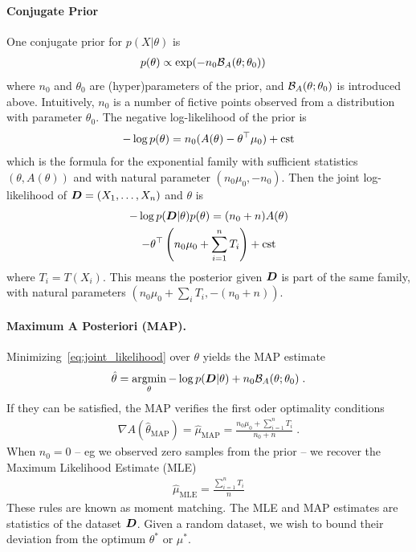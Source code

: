 \documentclass[twoside]{article}
\newcommand{\logpart}{A}
\newcommand{\bregman}{\cB_\logpart}
\newcommand{\natp}{\theta}
\newcommand{\meanp}{\mu}
\begin{document}
\paragraph{Conjugate Prior}
One conjugate prior \citep{agarwal2010geometric} for $p(X|\natp)$ is
\begin{align}
    p(\natp) &\propto \exp( - n_0 \bregman(\natp ; \natp_0) )
\end{align}
where $n_0$ and $\natp_0$ are (hyper)parameters of the prior, and $\bregman(\natp ; \natp_0)$ is introduced above.
Intuitively, $n_0$ is a number of fictive points observed from a distribution with parameter $\natp_0$.
The negative log-likelihood of the prior is
\begin{align*}
    -\log p(\natp) = n_0 (\logpart(\natp)  - \natp^\top \meanp_0 ) + \cst
\end{align*}
which is the formula for the exponential family with sufficient statistics $(\natp ,\logpart(\natp))$ and with natural parameter $(n_0 \mu_0, -n_0)$.
Then the joint log-likelihood of ${\bm{D}} =(X_1,\dots,X_n)$ and $\natp$ is
\begin{multline}
    -\log p(\mD|\natp)p(\natp) 
    = (n_0+n) \logpart (\natp) \\
    - \theta^\top \left(n_0 \meanp_0 + \sum_{i=1}^n T_i \right) + \cst
    \label{eq:joint_likelihood}
\end{multline}
where $T_i=T(X_i)$.
This means the posterior given ${\bm{D}}$ is part of the same family, with natural parameters $(n_0 \mu_0 + \sum_i T_i , -(n_0 + n))$.

\paragraph{Maximum A Posteriori (MAP).}
Minimizing~\eqref{eq:joint_likelihood} over $\natp$ yields the MAP estimate
\begin{align}
    \hat \natp = \argmin_\natp -\log p(\mD|\natp) + n_0 \bregman(\natp ; \natp_0) \; .
\end{align}
If they can be satisfied, the MAP verifies the first oder optimality conditions
\begin{align}
    \nabla \logpart(\hat \natp_\text{MAP}) = \hat \meanp_\text{MAP}
    = \frac{n_0 \meanp_0 + \sum_{i=1}^n T_i}{n_0+n} \; .
\end{align}
When $n_0=0$ -- eg we observed zero samples from the prior -- we recover the Maximum Likelihood Estimate (MLE)
\begin{align}
	\hat \mu_\text{MLE} = \frac{\sum_{i=1}^n T_i}{n}
\end{align}
These rules are known as moment matching.
The MLE and MAP estimates are statistics of the dataset ${\bm{D}}$. Given a random dataset, we wish to bound their deviation from the optimum $\natp^*$ or $\meanp^*$.
\end{document}
